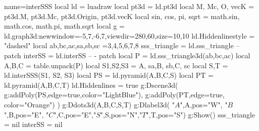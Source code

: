 \documentclass[12pt]{standalone}
\begin{document}
\begin{luadraw}{name=interSSS}
local ld = luadraw
local pt3d = ld.pt3d
local M, Mc, O, vecK = pt3d.M, pt3d.Mc, pt3d.Origin,  pt3d.vecK
local sin, cos, pi, sqrt = math.sin, math.cos, math.pi, math.sqrt
local g = ld.graph3d:new{window={-5,7,-6,7},viewdir={280,60},size={10,10}} 
ld.Hiddenlinestyle = "dashed"
local ab,bc,ac,sa,sb,sc =3,4,5,6,7,8
sss_triangle = ld.sss_triangle -- patch
interSS = ld.interSS -- - patch
local P = ld.sss_triangle3d(ab,bc,ac)
local A,B,C = table.unpack(P)
local S1,S2,S3 = {A, sa},{B, sb},{C, sc}
local S,T = ld.interSSS(S1, S2, S3)
local PS = ld.pyramid({A,B,C},S)
local PT = ld.pyramid({A,B,C},T)
ld.Hiddenlines = true
g:Dscene3d(
 g:addPoly(PS,{edge=true,color="LightBlue"}),
  g:addPoly(PT,{edge=true, color="Orange"})
    )
g:Ddots3d({A,B,C,S,T})
g:Dlabel3d( "$A$",A,{pos="W"}, "$B$",B,{pos="E"}, "$C$",C,{pos="E"},"$S$",S,{pos="N"},"$T$",T,{pos="S"})
g:Show()
sss_triangle = nil
interSS = nil
\end{luadraw} 
\end{document}
